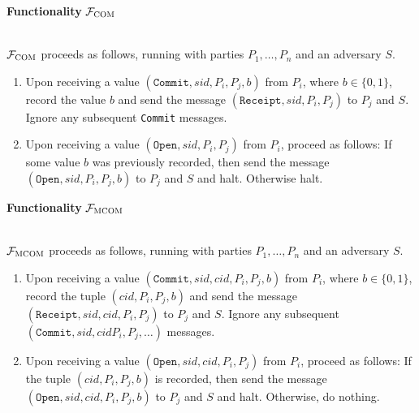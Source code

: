 \documentclass[a4paper]{article}
\newcommand{\F}{\mathcal{F}}
\begin{document}
\begin{framed}
    \centerline{\textbf{Functionality} $\F_{\textsc{COM}}$}
    \ \\
    \noindent $\F_{\textsc{COM}}$ proceeds as follows, running with parties $P_1, \ldots, P_n$ and an adversary $S$.
    
    \begin{enumerate}
        \item Upon receiving a value $(\texttt{Commit}, sid, P_i, P_j, b)$ from $P_i$, where $b \in \{ 0, 1 \}$, record the value $b$ and send the message $(\texttt{Receipt}, sid, P_i, P_j)$ to $P_j$ and $S$. Ignore any subsequent \texttt{Commit} messages.

        \item Upon receiving a value $(\texttt{Open}, sid, P_i, P_j)$ from $P_i$, proceed as follows: If some value $b$ was previously recorded, then send the message $(\texttt{Open}, sid, P_i, P_j, b)$ to $P_j$ and $S$ and halt. Otherwise halt.
    \end{enumerate}
\end{framed}

\begin{framed}
    \centerline{\textbf{Functionality} $\F_{\textsc{MCOM}}$}
    \ \\
    \noindent $\F_{\textsc{MCOM}}$ proceeds as follows, running with parties $P_1, \ldots, P_n$ and an adversary $S$.
    
    \begin{enumerate}
        \item Upon receiving a value $(\texttt{Commit}, sid, cid, P_i, P_j, b)$ from $P_i$, where $b \in \{ 0, 1 \}$, record the tuple $(cid, P_i, P_j, b)$ and send the message $(\texttt{Receipt}, sid, cid, P_i, P_j)$ to $P_j$ and $S$. Ignore any subsequent $(\texttt{Commit}, sid, cid P_i, P_j, \ldots)$ messages.

        \item Upon receiving a value $(\texttt{Open}, sid, cid, P_i, P_j)$ from $P_i$, proceed as follows: If the tuple $(cid, P_i, P_j, b)$ is recorded, then send the message $(\texttt{Open}, sid, cid, P_i, P_j, b)$ to $P_j$ and $S$ and halt. Otherwise, do nothing.
    \end{enumerate}
\end{framed}





\end{document}
